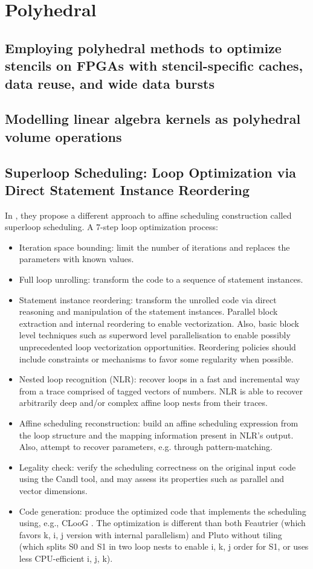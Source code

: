 \section{Polyhedral}\label{sec:polly}
\subsection{Employing polyhedral methods to optimize stencils on FPGAs with stencil-specific caches, data reuse, and wide data bursts}

\subsection{Modelling linear algebra kernels as polyhedral volume operations}

\subsection{Superloop Scheduling: Loop Optimization via Direct Statement Instance Reordering}
In \cite{bastoul2023superloop}, they propose a different approach to affine scheduling construction called superloop scheduling. A 7-step loop optimization process:
\begin{itemize}
    \item Iteration space bounding: limit the number of iterations and replaces the parameters with known values.
    \item Full loop unrolling: transform the code to a sequence of statement instances.
    \item Statement instance reordering: transform the unrolled code via direct reasoning and manipulation of the statement instances. Parallel block extraction and internal reordering to enable vectorization. Also, basic block level techniques such as superword level parallelisation \cite{Mendis_2018} to enable possibly unprecedented loop vectorization opportunities. Reordering policies should include constraints or mechanisms to favor some regularity when possible.
    \item Nested loop recognition (NLR): recover loops in a fast and incremental way \cite{ketterlin2008prediction} from a trace comprised of tagged vectors of numbers. NLR is able to recover arbitrarily deep and/or complex affine loop nests from their traces.
    \item Affine scheduling reconstruction: build an affine scheduling expression from the loop structure and the mapping information present in NLR’s output. Also, attempt to recover parameters, e.g. through pattern-matching.
    \item Legality check: verify the scheduling correctness on the original input code using the Candl tool, and may assess its properties such as parallel and vector dimensions.
    \item Code generation: produce the optimized code that implements the scheduling using, e.g., CLooG \cite{bastoul2004code}. The optimization is different than both Feautrier \cite{feautrier1992some} (which favors k, i, j version with internal parallelism) and Pluto without tiling \cite{bondhugula2008practical} (which splits S0 and S1 in two loop nests to enable i, k, j order for S1, or uses less CPU-efficient i, j, k).
\end{itemize}
